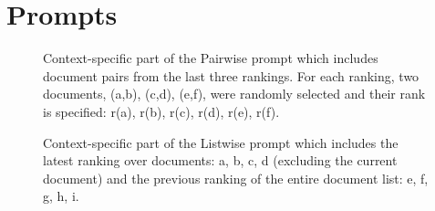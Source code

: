 \appendix
\section{Prompts}\label{appendix_prompt}


\begin{figure}[H]
\centering

\caption{Context-specific part of the Pairwise prompt which includes document pairs from the last three rankings. For each ranking, two documents, (a,b), (c,d), (e,f), were randomly selected and their rank is specified: r(a), r(b), r(c), r(d), r(e), r(f).}
\label{prompt_pairwise}
\end{figure}

\begin{figure}[H]
\centering

\caption{Context-specific part of the Listwise prompt which includes the latest ranking over documents: a, b, c, d (excluding the current document) and the previous ranking of the entire document list: e, f, g, h, i.}
\label{prompt_listwise}
\end{figure}



